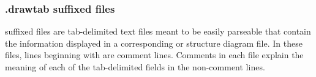\subsubsection{.drawtab suffixed files}
 suffixed files are tab-delimited text files meant to
be easily parseable that contain the information displayed in a
corresponding  or  structure diagram file. 
In these files, lines beginning with \prog{\#} are comment
lines. Comments in each file explain the meaning of each of the
tab-delimited fields in the non-comment lines. 










